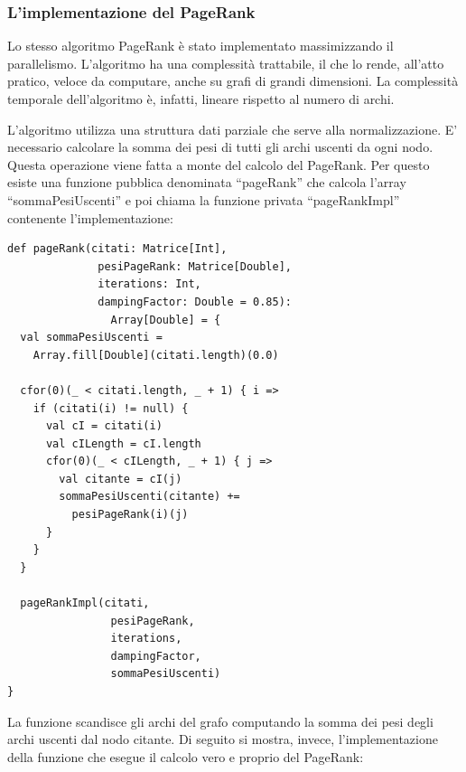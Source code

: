 \documentclass[a4paper, 12pt]{article}
\begin{document}
\subsubsection{L'implementazione del PageRank}
Lo stesso algoritmo PageRank è stato implementato massimizzando il parallelismo. L'algoritmo ha una complessità trattabile, il che lo rende, all'atto pratico, veloce da computare, anche su grafi di grandi dimensioni. La complessità temporale dell'algoritmo è, infatti, lineare rispetto al numero di archi.
\par
L'algoritmo utilizza una struttura dati parziale che serve alla normalizzazione. E' necessario calcolare la somma dei pesi di tutti gli archi uscenti da ogni nodo. Questa operazione viene fatta a monte del calcolo del PageRank. Per questo esiste una funzione pubblica denominata ``pageRank'' che calcola l'array ``sommaPesiUscenti'' e poi chiama la funzione privata ``pageRankImpl'' contenente l'implementazione:
\begin{lstlisting}[keepspaces=true]
def pageRank(citati: Matrice[Int],
              pesiPageRank: Matrice[Double],
              iterations: Int,
              dampingFactor: Double = 0.85):
                Array[Double] = {
  val sommaPesiUscenti =
    Array.fill[Double](citati.length)(0.0)

  cfor(0)(_ < citati.length, _ + 1) { i =>
    if (citati(i) != null) {
      val cI = citati(i)
      val cILength = cI.length
      cfor(0)(_ < cILength, _ + 1) { j =>
        val citante = cI(j)
        sommaPesiUscenti(citante) +=
          pesiPageRank(i)(j)
      }
    }
  }

  pageRankImpl(citati,
                pesiPageRank,
                iterations,
                dampingFactor,
                sommaPesiUscenti)
}
\end{lstlisting}
La funzione scandisce gli archi del grafo computando la somma dei pesi degli archi uscenti dal nodo citante.
Di seguito si mostra, invece, l'implementazione della funzione che esegue il calcolo vero e proprio del PageRank:
\end{document}
